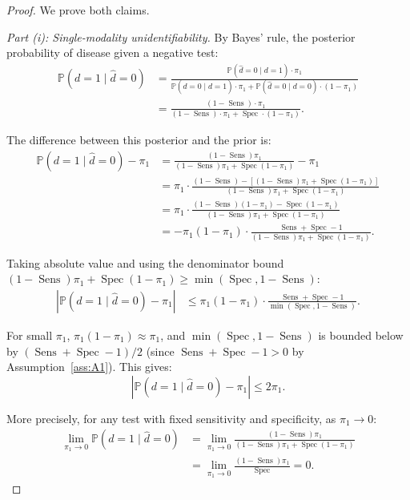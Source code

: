 \documentclass[11pt,a4paper]{article}
\theoremstyle{definition}
\DeclareMathOperator{\Sens}{Sens}
\DeclareMathOperator{\Spec}{Spec}
\newcommand{\Pbb}{\mathbb{P}}
\newcommand{\abs}[1]{\left|#1\right|}
\newcommand{\disease}{d}                       %
\newcommand{\diagnosis}{\hat{d}}               %
\begin{document}
\begin{proof}
We prove both claims.

\medskip\noindent\textit{Part (i): Single-modality unidentifiability.}
By Bayes' rule, the posterior probability of disease given a negative test:
\begin{align}
    \Pbb(\disease = 1 \mid \diagnosis = 0)
    &= \frac{\Pbb(\diagnosis = 0 \mid \disease = 1) \cdot \pi_1}
           {\Pbb(\diagnosis = 0 \mid \disease = 1) \cdot \pi_1
            + \Pbb(\diagnosis = 0 \mid \disease = 0) \cdot (1 - \pi_1)} \\
    &= \frac{(1 - \Sens) \cdot \pi_1}{(1 - \Sens) \cdot \pi_1 + \Spec \cdot (1 - \pi_1)}.
\end{align}

The difference between this posterior and the prior is:
\begin{align}
    \Pbb(\disease=1 \mid \diagnosis=0) - \pi_1
    &= \frac{(1-\Sens)\pi_1}{(1-\Sens)\pi_1 + \Spec(1-\pi_1)} - \pi_1 \\
    &= \pi_1 \cdot \frac{(1-\Sens) - [(1-\Sens)\pi_1 + \Spec(1-\pi_1)]}{(1-\Sens)\pi_1 + \Spec(1-\pi_1)} \\
    &= \pi_1 \cdot \frac{(1-\Sens)(1-\pi_1) - \Spec(1-\pi_1)}{(1-\Sens)\pi_1 + \Spec(1-\pi_1)} \\
    &= -\pi_1(1-\pi_1) \cdot \frac{\Sens + \Spec - 1}{(1-\Sens)\pi_1 + \Spec(1-\pi_1)}.
\end{align}

Taking absolute value and using the denominator bound
$(1-\Sens)\pi_1 + \Spec(1-\pi_1) \ge \min(\Spec, 1-\Sens)$:
\begin{align}
    \abs{\Pbb(\disease=1 \mid \diagnosis=0) - \pi_1}
    &\le \pi_1(1-\pi_1) \cdot \frac{\Sens + \Spec - 1}{\min(\Spec, 1-\Sens)}.
\end{align}

For small $\pi_1$, $\pi_1(1-\pi_1) \approx \pi_1$, and $\min(\Spec, 1-\Sens)$
is bounded below by $(\Sens + \Spec - 1)/2$ (since $\Sens + \Spec - 1 > 0$
by Assumption~\ref{ass:A1}). This gives:
\begin{equation}
    \abs{\Pbb(\disease=1 \mid \diagnosis=0) - \pi_1} \le 2\pi_1.
\end{equation}

More precisely, for any test with fixed sensitivity and specificity,
as $\pi_1 \to 0$:
\begin{align}
    \lim_{\pi_1 \to 0} \Pbb(\disease = 1 \mid \diagnosis = 0)
    &= \lim_{\pi_1 \to 0} \frac{(1-\Sens)\pi_1}{(1-\Sens)\pi_1 + \Spec(1-\pi_1)} \\
    &= \lim_{\pi_1 \to 0} \frac{(1-\Sens)\pi_1}{\Spec} = 0.
\end{align}


\end{proof}
\end{document}
